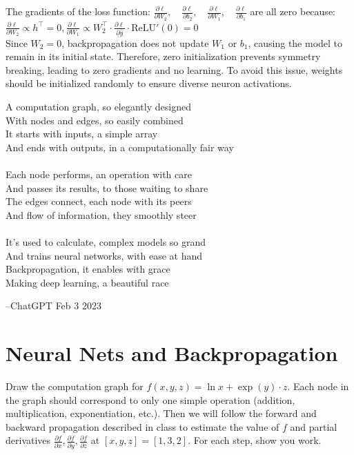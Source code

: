 \begin{enumerate}
{    The gradients of the loss function:
    $\frac{\partial \ell}{\partial W_2}, \quad \frac{\partial \ell}{\partial b_2}, \quad \frac{\partial \ell}{\partial W_1}, \quad \frac{\partial \ell}{\partial b_1}$
    are all zero because:
    $\frac{\partial \ell}{\partial W_2} \propto h^\top = 0,
    \frac{\partial \ell}{\partial W_1} \propto W_2^\top \cdot \frac{\partial \ell}{\partial \hat{y}} \cdot \text{ReLU}'(0) = 0$ \\
    Since $W_2 = 0$, backpropagation does not update $W_1$ or $b_1$, causing the model to remain in its initial state.
    Therefore, zero initialization prevents symmetry breaking, leading to zero gradients and no learning. To avoid this issue, weights should be initialized randomly to ensure diverse neuron activations.}
  
\end{enumerate}

\clearpage

\begin{table}
\vspace{-2cm}
 \begin{framed}
 \footnotesize
A computation graph, so elegantly designed\\
With nodes and edges, so easily combined\\
It starts with inputs, a simple array \\
 And ends with outputs, in a computationally fair way \\\\ 
Each node performs, an operation with care\\
And passes its results, to those waiting to share\\
The edges connect, each node with its peers\\
And flow of information, they smoothly steer\\\\
It's used to calculate, complex models so grand\\
And trains neural networks, with ease at hand\\
Backpropagation, it enables with grace\\
Making deep learning, a beautiful race

\hspace{4cm}--ChatGPT Feb 3 2023 
\end{framed}
\end{table}
\section{Neural Nets and Backpropagation}
Draw the computation graph for $f(x, y, z) = \ln x + \exp(y) \cdot z$. Each node in the graph should correspond to only one simple operation (addition, multiplication, exponentiation, etc.). Then we will follow the forward and backward propagation described in class to estimate the value of $f$ and partial derivatives $\frac{\partial f}{\partial x}, \frac{\partial f}{\partial y}, \frac{\partial f}{\partial z}$ at $[x, y, z] = [1, 3, 2]$. For each step, show you work.  \\ \\ \\
    

